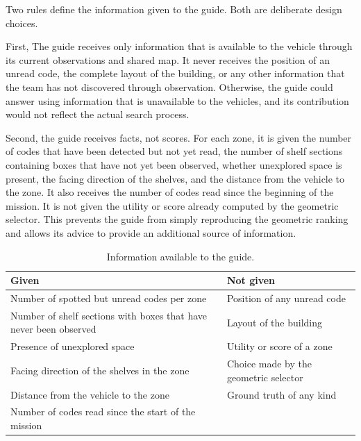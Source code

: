 Two rules define the information given to the guide. Both are deliberate design
choices.

First, The guide receives only information that is available to the vehicle through its current observations and shared map. It
never receives the position of an unread code, the complete layout of the
building, or any other information that the team has not discovered through
observation. Otherwise, the guide could answer using information that is
unavailable to the vehicles, and its contribution would not reflect the actual
search process.

Second, the guide receives facts, not scores. For each zone, it is given the
number of codes that have been detected but not yet read, the number of shelf
sections containing boxes that have not yet been observed, whether unexplored
space is present, the facing direction of the shelves, and the distance from the
vehicle to the zone. It also receives the number of codes read since the
beginning of the mission. It is not given the utility or score already computed
by the geometric selector. This prevents the guide from simply reproducing the
geometric ranking and allows its advice to provide an additional source of
information.

\begin{table}[!htb]
    \centering
    \caption{Information available to the guide.}%
    \label{tab:sys:guide-info}
    \setlength{\tabcolsep}{4pt}
    \begin{tabular}{@{}>{\raggedright\arraybackslash}p{7.6cm}
            >{\raggedright\arraybackslash}p{7.2cm}@{}}
        \toprule
        \textbf{Given}                                                   & \textbf{Not given}                    \\
        \midrule
        Number of spotted but unread codes per zone                      & Position of any unread code           \\
        \addlinespace
        Number of shelf sections with boxes that have never been observed & Layout of the building               \\
        \addlinespace
        Presence of unexplored space                                     & Utility or score of a zone            \\
        \addlinespace
        Facing direction of the shelves in the zone                      & Choice made by the geometric selector \\
        \addlinespace
        Distance from the vehicle to the zone                            & Ground truth of any kind              \\
        \addlinespace
        Number of codes read since the start of the mission              &                                       \\
        \bottomrule
    \end{tabular}
\end{table}

